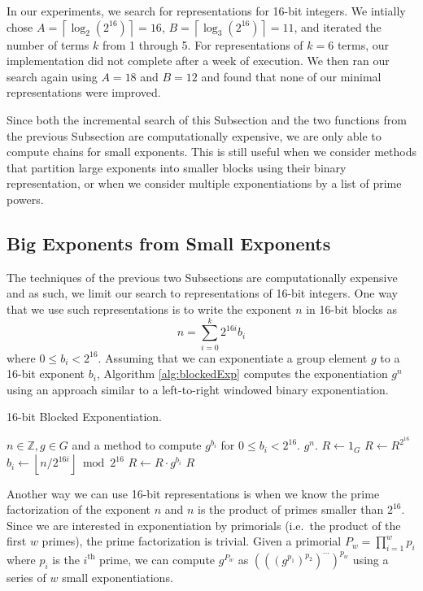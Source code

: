 \documentclass{ucalgthes1}
\theoremstyle{definition}
\newcommand{\ZZ}{\mathbb{Z}}
\newcommand{\floor}[1]{\left\lfloor #1 \right\rfloor}
\newcommand{\ceil}[1]{\left\lceil #1 \right\rceil}
\begin{document}
In our experiments, we search for representations for 16-bit integers. We intially chose $A = \ceil{\log_2\left(2^{16}\right)} = 16$, $B = \ceil{\log_3 \left(2^{16}\right)} = 11$, and iterated the number of terms $k$ from 1 through 5. For representations of $k = 6$ terms, our implementation did not complete after a week of execution.  We then ran our search again using $A=18$ and $B=12$ and found that none of our minimal representations were improved.

Since both the incremental search of this Subsection and the two functions from the previous Subsection are computationally expensive, we are only able to compute chains for small exponents.  This is still useful when we consider methods that partition large exponents into smaller blocks using their binary representation, or when we consider multiple exponentiations by a list of prime powers.


\subsection{Big Exponents from Small Exponents}

The techniques of the previous two Subsections are computationally expensive and as such, we limit our search to representations of 16-bit integers.  One way that we use such representations is to write the exponent $n$ in 16-bit blocks as
\[
	n = \sum_{i=0}^k 2^{16i} b_i
\]
where $0 \le b_i < 2^{16}$.  Assuming that we can exponentiate a group element $g$ to a 16-bit exponent $b_i$, Algorithm \ref{alg:blockedExp} computes the exponentiation $g^n$ using an approach similar to a left-to-right windowed binary exponentiation.

\begin{algorithm}[H]
\caption{16-bit Blocked Exponentiation.}
\label{alg:blockedExp}
\begin{algorithmic}[1]
\REQUIRE $n \in \ZZ, g \in G$ and a method to compute $g^{b_i}$ for $0 \le b_i < 2^{16}$.
\ENSURE $g^n$.
\STATE $R \gets 1_G$
\FOR {$i$ from $\ceil{\log_{2^{16}} n}$ downto 0}
	\STATE $R \gets R^{2^{16}}$ 
	\STATE $b_i \gets \floor{n / 2^{16i}} \bmod {2^{16}}$
	\STATE $R \gets R \cdot g^{b_i}$
\ENDFOR
\RETURN $R$
\end{algorithmic}
\end{algorithm}

Another way we can use 16-bit representations is when we know the prime factorization of the exponent $n$ and $n$ is the product of primes smaller than $2^{16}$.  Since we are interested in exponentiation by primorials (i.e.\ the product of the first $w$ primes), the prime factorization is trivial. Given a primorial $P_w = \prod_{i=1}^w p_i$ where $p_i$ is the $i^{\textrm{th}}$ prime, we can compute $g^{P_w}$ as $(((g^{p_1})^{p_2})^{\cdots})^{p_w}$ using a series of $w$ small exponentiations.
\end{document}
